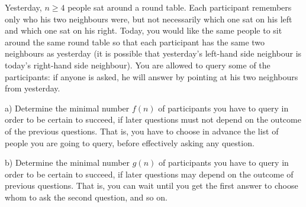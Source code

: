 Yesterday, $n\ge 4$ people sat around a round table. Each participant remembers only who his two neighbours were, but not necessarily which one sat on his left and which one sat on his right. Today, you would like the same people to sit around the same round table so that each participant has the same two neighbours as yesterday (it is possible that yesterday’s left-hand side neighbour is today’s right-hand side neighbour). You are allowed to query some of the participants: if anyone is asked, he will answer by pointing at his two neighbours from yesterday.

a) Determine the minimal number $f(n)$ of participants you have to query in order to be certain to succeed, if later questions must not depend on the outcome of the previous questions. That is, you have to choose in advance the list of people you are going to query, before effectively asking any question.

b) Determine the minimal number $g(n)$ of participants you have to query in order to be certain to succeed, if later questions may depend on the outcome of previous questions. That is, you can wait until you get the first answer to choose whom to ask the second question, and so on.